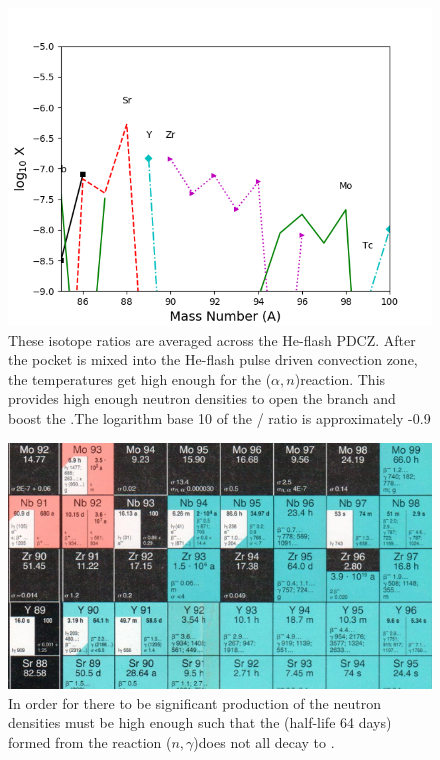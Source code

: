 \documentclass[fleqn,usenatbib]{mnras}
\begin{document}
\begin{figure}
  \includegraphics[width=\columnwidth]{figs/Pulse_Zr.png}
  \caption{These isotope ratios are averaged across the He-flash PDCZ. After the \carbon[13] pocket is mixed into the He-flash pulse driven convection zone, the temperatures get high enough for the \neon[22]($\alpha,n$)\magnesium[25] reaction. This provides high enough neutron densities to open the \zirconium[95] branch and boost the \zirconium[96].The logarithm base 10 of the \zirconium[96] / \zirconium[94] ratio is approximately -0.9} 
\end{figure}

\begin{figure}
	\includegraphics[width=\columnwidth]{figs/Zr95_branch.png}
    \caption{In order for there to be significant production of \zirconium[96] the neutron densities must be high enough such that the \zirconium[95] (half-life 64 days) formed from the reaction \zirconium[94]($n,\gamma$)\zirconium[95] does not all decay to \niobium[95].}
\end{figure}
\end{document}
